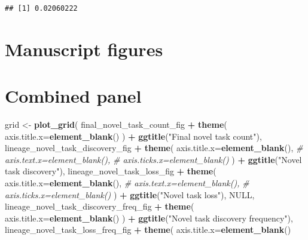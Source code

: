 \documentclass[]{book}
\newenvironment{Shaded}{\begin{snugshade}}{\end{snugshade}}
\newcommand{\CommentTok}[1]{\textcolor[rgb]{0.56,0.35,0.01}{\textit{#1}}}
\newcommand{\DataTypeTok}[1]{\textcolor[rgb]{0.13,0.29,0.53}{#1}}
\newcommand{\KeywordTok}[1]{\textcolor[rgb]{0.13,0.29,0.53}{\textbf{#1}}}
\newcommand{\NormalTok}[1]{#1}
\newcommand{\OperatorTok}[1]{\textcolor[rgb]{0.81,0.36,0.00}{\textbf{#1}}}
\newcommand{\OtherTok}[1]{\textcolor[rgb]{0.56,0.35,0.01}{#1}}
\newcommand{\StringTok}[1]{\textcolor[rgb]{0.31,0.60,0.02}{#1}}
\begin{document}
\begin{verbatim}
## [1] 0.02060222
\end{verbatim}

\hypertarget{manuscript-figures-1}{%
\section{Manuscript figures}\label{manuscript-figures-1}}

\hypertarget{combined-panel}{%
\section{Combined panel}\label{combined-panel}}

\begin{Shaded}
\begin{Highlighting}[]
\NormalTok{grid <-}\StringTok{ }\KeywordTok{plot_grid}\NormalTok{(}
\NormalTok{  final_novel_task_count_fig }\OperatorTok{+}
\StringTok{    }\KeywordTok{theme}\NormalTok{(}
      \DataTypeTok{axis.title.x=}\KeywordTok{element_blank}\NormalTok{()}
\NormalTok{    ) }\OperatorTok{+}
\StringTok{    }\KeywordTok{ggtitle}\NormalTok{(}\StringTok{"Final novel task count"}\NormalTok{),}
\NormalTok{  lineage_novel_task_discovery_fig }\OperatorTok{+}
\StringTok{    }\KeywordTok{theme}\NormalTok{(}
      \DataTypeTok{axis.title.x=}\KeywordTok{element_blank}\NormalTok{(),}
      \CommentTok{# axis.text.x=element_blank(),}
      \CommentTok{# axis.ticks.x=element_blank()}
\NormalTok{    ) }\OperatorTok{+}
\StringTok{    }\KeywordTok{ggtitle}\NormalTok{(}\StringTok{"Novel task discovery"}\NormalTok{),}
\NormalTok{  lineage_novel_task_loss_fig }\OperatorTok{+}
\StringTok{    }\KeywordTok{theme}\NormalTok{(}
      \DataTypeTok{axis.title.x=}\KeywordTok{element_blank}\NormalTok{(),}
      \CommentTok{# axis.text.x=element_blank(),}
      \CommentTok{# axis.ticks.x=element_blank()}
\NormalTok{    ) }\OperatorTok{+}
\StringTok{    }\KeywordTok{ggtitle}\NormalTok{(}\StringTok{"Novel task loss"}\NormalTok{),}
  \OtherTok{NULL}\NormalTok{,}
\NormalTok{  lineage_novel_task_discovery_freq_fig }\OperatorTok{+}
\StringTok{    }\KeywordTok{theme}\NormalTok{(}
      \DataTypeTok{axis.title.x=}\KeywordTok{element_blank}\NormalTok{()}
\NormalTok{    ) }\OperatorTok{+}
\StringTok{    }\KeywordTok{ggtitle}\NormalTok{(}\StringTok{"Novel task discovery frequency"}\NormalTok{),}
\NormalTok{  lineage_novel_task_loss_freq_fig }\OperatorTok{+}
\StringTok{    }\KeywordTok{theme}\NormalTok{(}
      \DataTypeTok{axis.title.x=}\KeywordTok{element_blank}\NormalTok{()}

\end{Highlighting}
\end{Shaded}
\end{document}
